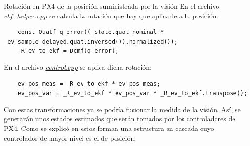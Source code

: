 \begin{codigo}[label=cod:invPX4]{Rotación en PX4 de la posición suministrada por la visión}
En el archivo \href{https://github.com/PX4/PX4-ECL/blob/ec934908900b23ee273d1a9f82364b7b38423200/EKF/ekf\_helper.cpp\#L1460}{\textit{ekf\_helper.cpp}} se calcula la rotación que hay que aplicarle a la posición:
\begin{verbatim}
    const Quatf q_error((_state.quat_nominal * _ev_sample_delayed.quat.inversed()).normalized());
    _R_ev_to_ekf = Dcmf(q_error);
\end{verbatim}
En el archivo \href{https://github.com/PX4/PX4-ECL/blob/ec934908900b23ee273d1a9f82364b7b38423200/EKF/control.cpp\#L273}{\textit{control.cpp}} se aplica dicha rotación:
\begin{verbatim}
    ev_pos_meas = _R_ev_to_ekf * ev_pos_meas;
    ev_pos_var = _R_ev_to_ekf * ev_pos_var * _R_ev_to_ekf.transpose();
\end{verbatim}
\end{codigo} 

Con estas transformaciones ya se podría fusionar la medida de la visión. Así, se generarán unos estados estimados que serán tomados por los controladores de PX4. Como se explicó en \cite{arias2019control} estos forman una estructura en cascada cuyo controlador de mayor nivel es el de posición. 


